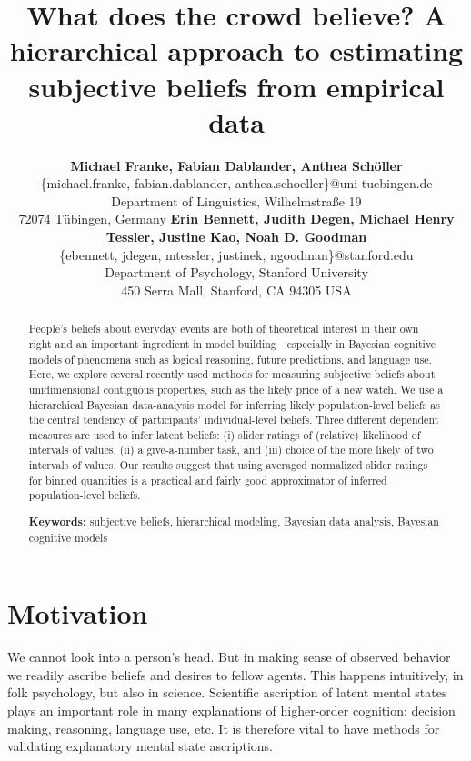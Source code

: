 \documentclass[10pt,letterpaper]{article}
\title{What does the crowd believe? A hierarchical approach to estimating subjective beliefs
  from empirical data}
\author{{\large \bf Michael Franke, Fabian Dablander, Anthea Sch\"{o}ller} \\
  \{michael.franke, fabian.dablander, anthea.schoeller\}@uni-tuebingen.de \\
  Department of Linguistics, Wilhelmstra\ss e 19 \\
  72074 T\"{u}bingen, Germany \AND
  {\large \bf Erin Bennett, Judith Degen, Michael Henry Tessler, Justine Kao, Noah D. Goodman}\\
  \{ebennett, jdegen, mtessler, justinek, ngoodman\}@stanford.edu \\
  Department of Psychology, Stanford University \\
  450 Serra Mall, Stanford, CA 94305 USA }
\begin{document}
\maketitle

\begin{abstract}
  People's beliefs about everyday events are both of theoretical interest in
  their own right and an important ingredient in model building---especially in 
  Bayesian cognitive models of phenomena such as logical reasoning, future predictions, and language
  use. Here, we explore several recently used methods for measuring subjective beliefs about
  unidimensional contiguous properties, such as the likely price of a new watch. We use a
  hierarchical Bayesian data-analysis model for inferring likely population-level beliefs as the central
  tendency of participants' individual-level beliefs.  Three different dependent measures are
  used to infer latent beliefs: (i) slider ratings of (relative) likelihood of intervals of
  values, (ii) a give-a-number task, and (iii) choice of the more likely of two intervals of
  values. Our results suggest that using averaged normalized slider ratings for binned
  quantities is a practical and fairly good approximator of inferred population-level beliefs.

  \textbf{Keywords:} subjective beliefs, hierarchical modeling, Bayesian data analysis,
  Bayesian cognitive models
\end{abstract}




\section{Motivation}

We cannot look into a person's head. But in making sense of observed behavior we readily
ascribe beliefs and desires to fellow agents. This happens intuitively, in folk psychology, but
also in science. Scientific ascription of latent mental states plays an important role in many
explanations of higher-order cognition: decision making, reasoning, language use, etc. It is
therefore vital to have methods for validating explanatory mental state ascriptions.
\end{document}
